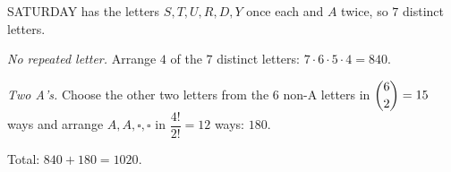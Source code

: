 SATURDAY has the letters $S,T,U,R,D,Y$ once each and $A$ twice, so $7$ distinct letters.

\emph{No repeated letter.} Arrange $4$ of the $7$ distinct letters: $7\cdot6\cdot5\cdot4=840$.

\emph{Two A's.} Choose the other two letters from the $6$ non-A letters in $\dbinom62=15$ ways and arrange $A,A,\square,\square$ in $\dfrac{4!}{2!}=12$ ways: $180$.

Total: $840+180=\boxed{1020}$.
